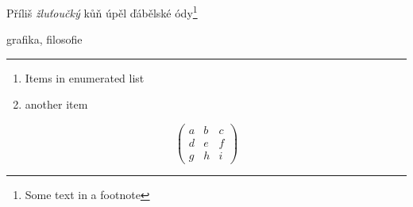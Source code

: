 \documentclass{article}
\begin{document}
Příliš \textit{žluťoučký} kůň úpěl ďábělské ódy\footnote{Some text in a footnote}

grafika, filosofie

\hrule

\begin{enumerate}
\item Items in enumerated list
\item another item
\end{enumerate}
\[ \left( \begin{array}{ccc}
a & b & c \\
d & e & f \\
g & h & i \end{array} \right)\] 
\end{document}

